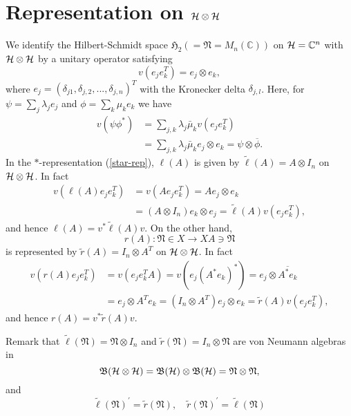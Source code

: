 \section{Representation on $\cal{H}\otimes\cal{H}$}

 We identify the Hilbert-Schmidt space $\mathfrak{H}_2(=\mathfrak{N}=M_n(\mathbb{C}))$ on ${\cal H}=\mathbb{C}^n$ with $\cal{H}\otimes\cal{H}$
by a unitary operator satisfying 
$$
v(e_je_k^T)=e_j\otimes e_k,
$$
where $e_j=(\delta_{j1},\delta_{j,2},...,\delta_{j,n})^T$ with the Kronecker delta $\delta_{j,l}$. 
Here, for $\psi=\sum_j \lambda_j e_j$ and $\phi=\sum_k \mu_k e_k$
we have
\begin{equation}
\begin{split}
v(\psi\phi^\ast)&=\sum_{j,k}\lambda_j\bar{\mu}_k v(e_je_k^T)\\
&=\sum_{j,k}\lambda_j\bar{\mu}_k e_j\otimes e_k={\psi}\otimes \overline{\phi}.
\end{split}
\end{equation}
In the $\ast$-representation (\ref{star-rep}), $\ell(A)$ is given by $\tilde{\ell}(A)=A\otimes I_n$ on $\cal{H}\otimes\cal{H}$.
In fact
 \begin{equation}
 \begin{split}
 v(\ell(A)e_je_k^T)&=v(Ae_je_k^T)=Ae_j\otimes e_k\\
 &= (A\otimes I_n)e_k\otimes  e_j=\tilde{\ell}(A)v(e_je_k^T),
 \end{split} 
 \end{equation}
 and hence $\ell(A)=v^{\ast}\tilde{\ell}(A)v$. 
On the other hand, 
$$
r(A):\mathfrak{N}\in X \to XA\ni\mathfrak{N}
$$ 
is represented by $\tilde{r}(A)=I_n\otimes A^T$ on $\cal{H}\otimes\cal{H}$.
In fact
 \begin{equation}
 \begin{split}
 v(r(A)e_je_k^T)&=v(e_je_k^TA)=v(e_j(A^\ast e_k)^\ast)=e_j\otimes \overline{A^\ast e_k}\\
 &= e_j \otimes A^T e_k= (I_n\otimes A^T)e_j\otimes  e_k=\tilde{r}(A)v(e_je_k^T),
 \end{split} 
 \end{equation}
 and hence $r(A)=v^{\ast}\tilde{r}(A) v$. 

Remark that $\tilde{\ell}(\mathfrak{N})=\mathfrak{N}\otimes I_n$ and $\tilde{r}(\mathfrak{N})=I_n\otimes \mathfrak{N}$ are von Neumann algebras in 
$$\mathfrak{B}({\cal H}\otimes{\cal H})=\mathfrak{B}({\cal H})\otimes \mathfrak{B}({\cal H})=\mathfrak{N}\otimes \mathfrak{N},
$$
and 
\begin{equation}\label{lr}
\tilde{\ell}(\mathfrak{N})^\prime=\tilde{r}({\mathfrak{N}}),\quad
\tilde{r}(\mathfrak{N})^\prime=\tilde{\ell}(\mathfrak{N})
\end{equation}